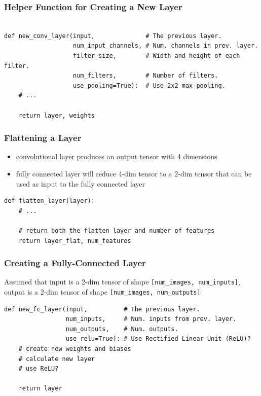 \documentclass[11pt]{article}
\begin{document}
\subsubsection*{Helper Function for Creating a New Layer}
\label{sec:orgacaf864}

\begin{verbatim}

def new_conv_layer(input,              # The previous layer.
                   num_input_channels, # Num. channels in prev. layer.
                   filter_size,        # Width and height of each filter.
                   num_filters,        # Number of filters.
                   use_pooling=True):  # Use 2x2 max-pooling.
    # ...

    return layer, weights
\end{verbatim}
\subsubsection*{Flattening a Layer}
\label{sec:org64df0cd}

\begin{itemize}
\item convolutional layer produces an output tensor with 4 dimensions
\item fully connected layer will reduce 4-dim tensor to a 2-dim tensor that can be used as input to the fully connected layer
\end{itemize}

\begin{verbatim}
def flatten_layer(layer):
    # ...

    # return both the flatten layer and number of features
    return layer_flat, num_features

\end{verbatim}
\subsubsection*{Creating a Fully-Connected Layer}
\label{sec:orgb210325}

Assumed that input is a 2-dim tensor of shape \texttt{[num\_images, num\_inputs]}, output is a 2-dim tensor of shape \texttt{[num\_images, num\_outputs]}

\begin{verbatim}
def new_fc_layer(input,          # The previous layer.
                 num_inputs,     # Num. inputs from prev. layer.
                 num_outputs,    # Num. outputs.
                 use_relu=True): # Use Rectified Linear Unit (ReLU)?
    # create new weights and biases
    # calculate new layer
    # use ReLU?

    return layer
\end{verbatim}
\end{document}
